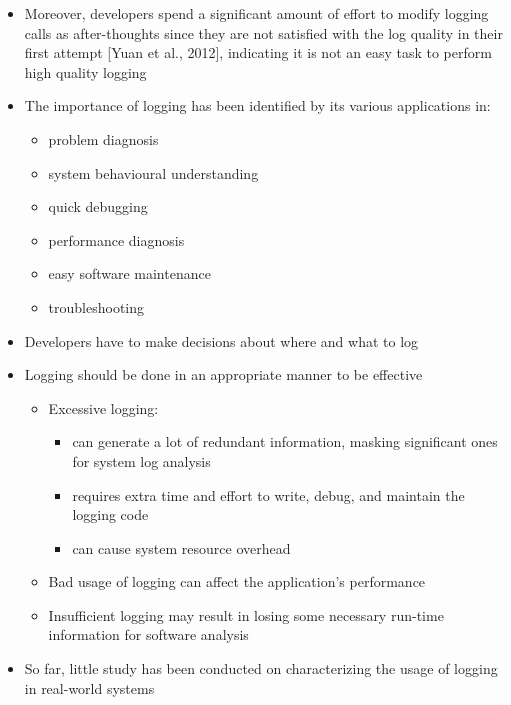 \documentclass{article}
\begin{document}
\begin{itemize} [leftmargin=.1in]
\item Moreover, developers spend a significant amount of effort to modify logging calls as after-thoughts since they are not satisfied with the log quality in their first attempt [Yuan et al., 2012], indicating it is not an easy task to perform high quality logging
\item The importance of logging has been identified by its various applications in:
\begin{itemize}
\item{problem diagnosis}
\item{system behavioural understanding}
\item{quick debugging}
\item{performance diagnosis}
\item{ easy software maintenance }
 \item{ troubleshooting}
\end{itemize}

\item Developers have to make decisions about where and what to log
\item Logging should be done in an appropriate manner to be effective
\begin{itemize}
\item Excessive logging:
\begin{itemize}
\item can generate a lot of redundant information, masking significant ones for system log analysis
\item requires extra time and effort to write, debug, and maintain the logging code
\item can cause system resource overhead
\end{itemize}
\item Bad usage of logging can affect the application's performance
\item Insufficient logging may result in losing some necessary run-time information for software analysis
\end{itemize}

\item So far, little study has been conducted on characterizing the usage of logging in real-world systems%


\end{itemize}
\end{document}
